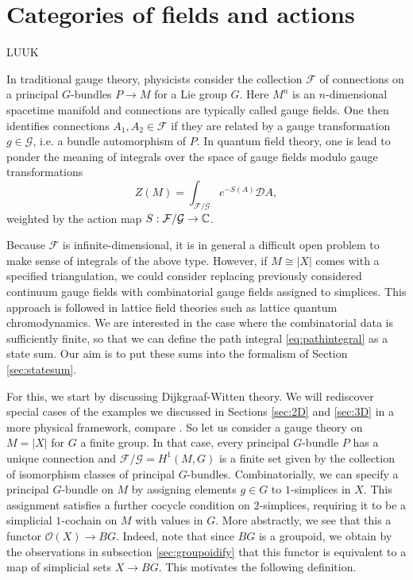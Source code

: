 
\section{Categories of fields and actions}

LUUK

In traditional gauge theory, physicists consider the collection $\mathcal{F}$ of connections on a principal $G$-bundles $P \to M$ for a Lie group $G$.
Here $M^n$ is an $n$-dimensional spacetime manifold and connections are typically called gauge fields.
One then identifies connections $A_1, A_2 \in \mathcal{F}$ if they are related by a gauge transformation $g \in \mathcal{G}$, i.e. a bundle automorphism of $P$.
In quantum field theory, one is lead to ponder the meaning of integrals over the space of gauge fields modulo gauge transformations
\begin{equation}
    \label{eq:pathintegral}
Z(M) = \int_{\mathcal{F}/\mathcal{G}} e^{-S(A)} \mathcal{D} A,
\end{equation}
weighted by the action map $S: \mathcal{F}/\mathcal{G} \to \mathbb{C}$.

Because $\mathcal{F}$ is infinite-dimensional, it is in general a difficult open problem to make sense of integrals of the above type.
However, if $M \cong |X|$ comes with a specified triangulation, we could consider replacing previously considered continuum gauge fields with combinatorial gauge fields assigned to simplices.
This approach is followed in lattice field theories such as lattice quantum chromodynamics.
We are interested in the case where the combinatorial data is sufficiently finite, so that we can define the path integral \ref{eq:pathintegral} as a state sum.
Our aim is to put these sums into the formalism of Section \ref{sec:statesum}.

For this, we start by discussing Dijkgraaf-Witten theory.
We will rediscover special cases of the examples we discussed in Sections \ref{sec:2D} and \ref{sec:3D} in a more physical framework, compare \cite[Sections 3 and 4]{freed2009topological}.
So let us consider a gauge theory on $M = |X|$ for $G$ a finite group.
 In that case, every principal $G$-bundle $P$ has a unique connection and $\mathcal{F}/\mathcal{G} = H^1(M,G)$ is a finite set given by the collection of isomorphism classes of principal $G$-bundles.
 Combinatorially, we can specify a principal $G$-bundle on $M$ by assigning elements $g \in G$ to $1$-simplices in $X$.
 This assignment satisfies a further cocycle condition on $2$-simplices, requiring it to be a simplicial $1$-cochain on $M$ with values in $G$.
More abstractly, we see that this a functor $\mathcal{O}(X) \to BG$.
Indeed, note that since $BG$ is a groupoid, we obtain by the observations in subsection \ref{sec:groupoidify} that this functor is equivalent to a map of simplicial sets $X \to BG$.
This motivates the following definition.

